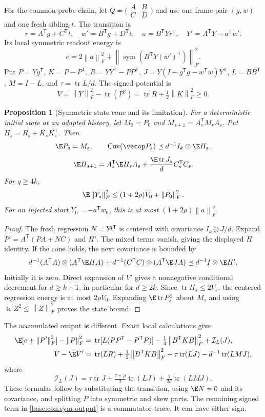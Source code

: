 \documentclass[11pt,oneside,openany,a4paper]{book}
\numberwithin{equation}{chapter}
\newtheorem{proposition}[theorem]{Proposition}
\theoremstyle{definition}
\theoremstyle{remark}
\newcommand{\T}{\mathsf T}\newcommand{\Id}{I}
\newcommand{\F}[1]{\left\lVert#1\right\rVert_F}
\DeclareMathOperator{\tr}{tr}\DeclareMathOperator{\rank}{rank}
\begin{document}
For the common-probe chain, let
$Q=\bigl(\begin{smallmatrix}A&B\\C&D\end{smallmatrix}\bigr)$ and use one frame pair $(g,w)$ and one fresh sibling $t$. The transition is
\[
 r=A^\T g+C^\T t,\quad w'=B^\T g+D^\T t,\quad
 a=B^\T Yr^\T,\quad Y'=A^\T Y-a^\T w'.
\]
Its local symmetric readout energy is
\[
 e=2\F a^2+\F{\operatorname{sym}(B^\T Y(w')^\T)}^2.
\]
Put $P=Yg^\T$, $K=P-P^\T$, $R=YY^\T-PP^\T$,
$J=Y(I-g^\T g-w^\T w)Y^\T$, $L=BB^\T$, $M=I-L$, and $\tau=\tr L/d$.
The signed potential is
\[
 V=\F Y^2-\tr(P^2)=\tr R+\tfrac12\F K^2\ge0.
\]

\begin{proposition}[Symmetric state cone and its limitation]\label{base:con:sym-cone}
For a deterministic initial state at an adapted history, let $M_0=P_0$ and $M_{s+1}=A_s^\T M_sA_s$. Put $H_s=R_s+K_sK_s^\T$. Then
\[
 \E P_s=M_s,\qquad
 \operatorname{Cov}(\vecop P_s)\preceq d^{-1}I_k\otimes\E H_s,
\]
\[
 \E H_{s+1}=A_s^\T\E H_sA_s+\frac{\E\tr J_s}{d}C_s^\T C_s.
\]
For $q\ge4k$,
\[
 \E\F{Y_s}^2\le(1+2\rho)V_0+\F{P_0}^2.
\]
For an injected start $Y_0=-a^\T w_0$, this is at most $(1+2\rho)\F a^2$.
\end{proposition}
\begin{proof}
The fresh regression $N=Yt^\T$ is centered with covariance $I_k\otimes J/d$. Expand $P'=A^\T(PA+NC)$ and $H'$. The mixed terms vanish, giving the displayed $H$ identity. If the cone holds, the next covariance is bounded by
\[
 d^{-1}(A^\T A)\otimes(A^\T\E H A)
 +d^{-1}(C^\T C)\otimes(A^\T\E J A)
 \preceq d^{-1}I\otimes\E H'.
\]
Initially it is zero. Direct expansion of $V'$ gives a nonnegative conditional decrement for $d\ge k+1$, in particular for $d\ge2k$. Since $\tr H_s\le2V_s$, the centered regression energy is at most $2\rho V_0$. Expanding $\E\tr P_s^2$ about $M_s$ and using $\tr Z^2\le\F Z^2$ proves the state bound.
\end{proof}

The accumulated output is different. Exact local calculations give
\begin{align}
 \E[e+\F{P'}^2]-\F P^2
 ={}&\tr[L(PP^\T-P^\T P)]
 -\tfrac14\F{B^\T KB}^2+\mathcal I_L(J),\label{base:con:sym-output}\\
 V-\E V'={}&\tr(LR)+\tfrac12\F{B^\T KB}^2
 -\tau\tr(LJ)-d^{-1}\tr(LMJ),\label{base:con:sym-V}
\end{align}
where
\[
 \mathcal I_L(J)=\tau\tr J+\tfrac{\tau+\rho}{2}\tr(LJ)
 +\tfrac1{2d}\tr(LMJ).
\]
These formulas follow by substituting the transition, using $\E N=0$ and its covariance, and splitting $P$ into symmetric and skew parts. The remaining signed term in \eqref{base:con:sym-output} is a commutator trace. It can have either sign.
\end{document}
